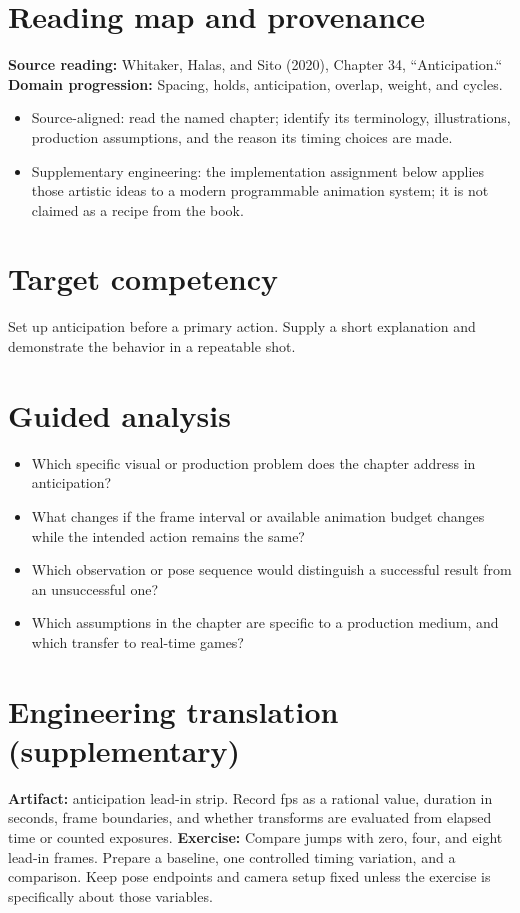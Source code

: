 \documentclass[10pt,letterpaper]{article}
\begin{document}
\makedoctitle
\makedocsummary

\section{Reading map and provenance}
\textbf{Source reading:} Whitaker, Halas, and Sito (2020), Chapter 34, ``Anticipation.``\\
\textbf{Domain progression:} Spacing, holds, anticipation, overlap, weight, and cycles.
\begin{itemize}
\item Source-aligned: read the named chapter; identify its terminology, illustrations, production assumptions, and the reason its timing choices are made.
\item Supplementary engineering: the implementation assignment below applies those artistic ideas to a modern programmable animation system; it is not claimed as a recipe from the book.
\end{itemize}
\section{Target competency}
Set up anticipation before a primary action. Supply a short explanation and demonstrate the behavior in a repeatable shot.
\section{Guided analysis}
\begin{itemize}
\item Which specific visual or production problem does the chapter address in anticipation?
\item What changes if the frame interval or available animation budget changes while the intended action remains the same?
\item Which observation or pose sequence would distinguish a successful result from an unsuccessful one?
\item Which assumptions in the chapter are specific to a production medium, and which transfer to real-time games?
\end{itemize}
\section{Engineering translation (supplementary)}
\textbf{Artifact:} anticipation lead-in strip. Record fps as a rational value, duration in seconds, frame boundaries, and whether transforms are evaluated from elapsed time or counted exposures.
\textbf{Exercise:} Compare jumps with zero, four, and eight lead-in frames. Prepare a baseline, one controlled timing variation, and a comparison. Keep pose endpoints and camera setup fixed unless the exercise is specifically about those variables.
\end{document}
